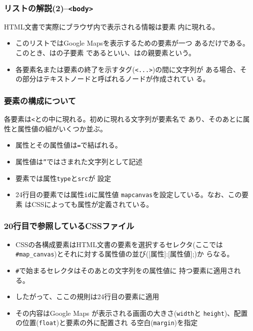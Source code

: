 \begin{frame}[containsverbatim]
 \frametitle{リストの解説(2)--\texttt{<body>}}
HTML文書で実際にブラウザ内で表示される情報は要素
       内に現れる。
\begin{itemize}
 \item このリストではGoogle Mapsを表示するための要素が一つ
       あるだけである。このとき、はの子要素
       であるといい、はの親要素という。
 \item 各要素名または要素の終了を示すタグ(\texttt{<...>})の間に文字列が
       ある場合、その部分はテキストノードと呼ばれるノードが作成されてい
       る。
\end{itemize}
\end{frame}
\begin{frame}[containsverbatim]
 \frametitle{要素の構成について}
各要素は\texttt{<}と\texttt{}の中に現れる。初めに現れる文字列が要素名で
 あり、そのあとに属性と属性値の組がいくつか並ぶ。
\begin{itemize}
 \item 属性とその属性値は\texttt{=}で結ばれる。
 \item 属性値は\texttt{”}ではさまれた文字列として記述
 \item {}要素では属性\texttt{type}と\texttt{src}が
       設定
 \item 24行目の要素では属性\texttt{id}に属性値
       \texttt{map\textunderscore canvas}を設定している。なお、この要素
       はCSSによっても属性が定義されている。
\end{itemize}
\end{frame}
\begin{frame}[containsverbatim]
 \frametitle{20行目で参照しているCSSファイル}
 \begin{itemize}
 \item CSSの各構成要素はHTML文書の要素を選択するセレクタ(ここでは
       \Verb+#map_canvas+)とそれに対する属性値の並び([属性]:[属性値];)か
       らなる。
 \item \Verb+#+で始まるセレクタはそのあとの文字列をの属性値に
       持つ要素に適用される。
 \item したがって、ここの規則は24行目の要素に適用
 \item その内容はGoogle Maps が表示される画面の大きさ(\texttt{width}と
       \texttt{height})、配置の位置(\texttt{float})と要素の外に配置され
       る空白(\texttt{margin})を指定
 \end{itemize}
\end{frame}
